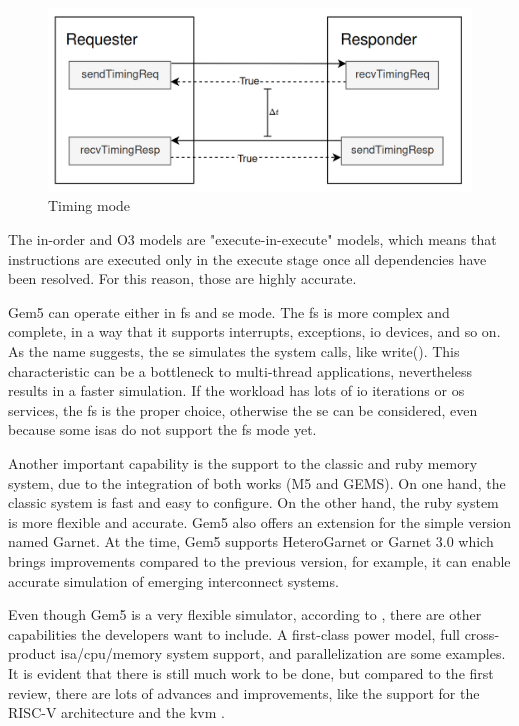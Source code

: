 \begin{figure}[H]
	\centering
 	\includegraphics[width=0.7\linewidth]{Images/TimingMode.png}
 	\caption{Timing mode}
	 \label{fig_TimingMode}
\end{figure}

The in-order and O3 models are "execute-in-execute" models, which means that instructions are executed only in the execute stage once all 
dependencies have been resolved. For this reason, those are highly accurate.

Gem5 can operate either in \gls{fs} and \gls{se} mode. The \gls{fs} is more complex and complete, in a way that it supports interrupts, 
exceptions, \gls{io} devices, and so on. As the name suggests, the \gls{se} simulates the system calls, like write(). This characteristic can 
be a bottleneck to multi-thread applications, nevertheless results in a faster simulation. If the workload has lots of \gls{io} iterations or 
\gls{os} services, the \gls{fs} is the proper choice, otherwise the \gls{se} can be considered, even because some \glspl{isa} do not support 
the \gls{fs} mode yet. 

Another important capability is the support to the classic and ruby memory system, due to the integration of both works (M5 and GEMS). On one 
hand, the classic system is fast and easy to configure. On the other hand, the ruby system is more flexible and accurate. Gem5 also offers an 
extension for the simple version named Garnet. At the time, Gem5 supports HeteroGarnet or Garnet 3.0 which brings improvements compared to the 
previous version, for example, it can enable accurate simulation of emerging interconnect systems. 


Even though Gem5 is a very flexible simulator, according to \cite{TheGem5Simulator}, there are other capabilities the developers want to 
include. A first-class power model, full cross-product \gls{isa}/\gls{cpu}/memory system support, and parallelization are some examples. 
It is evident that there is still much work to be done, but compared to the first review, there are lots of advances and improvements, like 
the support for the RISC-V architecture and the \gls{kvm} \cite{Thegem5simulatorV2}. 


